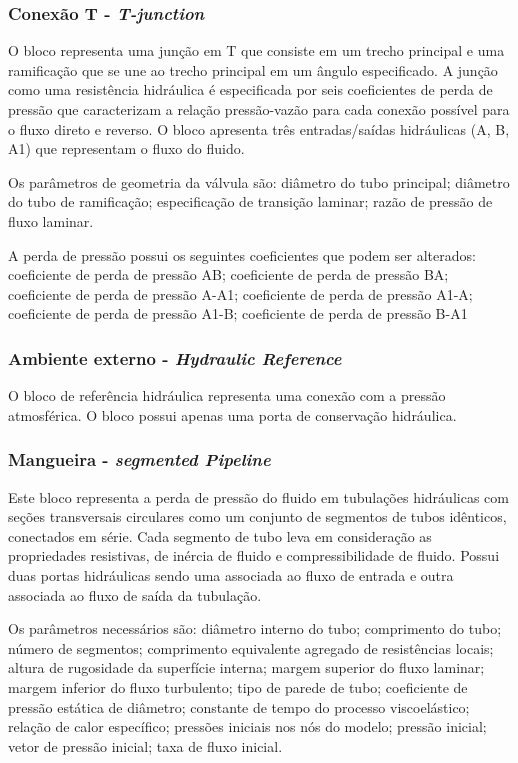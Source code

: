     \subsubsection{ Conexão T - \textit{T-junction} }
    \par O bloco representa uma junção em T que consiste em um trecho principal e uma ramificação que se une ao trecho principal em um ângulo especificado. A junção como uma resistência hidráulica é especificada por seis coeficientes de perda de pressão que caracterizam a relação pressão-vazão para cada conexão possível para o fluxo direto e reverso. O bloco apresenta três entradas/saídas hidráulicas (A, B, A1) que representam o fluxo do fluido. 
    \par Os parâmetros de geometria da válvula são: diâmetro do tubo principal; diâmetro do tubo de ramificação; especificação de transição laminar; razão de pressão de fluxo laminar.
    \par A perda de pressão possui os seguintes coeficientes que podem ser alterados: coeficiente de perda de pressão AB; coeficiente de perda de pressão BA; coeficiente de perda de pressão A-A1; coeficiente de perda de pressão A1-A; coeficiente de perda de pressão A1-B; coeficiente de perda de pressão B-A1
    
    \subsubsection{ Ambiente externo - \textit{Hydraulic Reference}} \par O bloco de referência hidráulica representa uma conexão com a pressão atmosférica. O bloco possui apenas uma porta de conservação hidráulica.
    
    \subsubsection{ Mangueira - \textit{segmented Pipeline}}
	\par Este bloco representa a perda de pressão do fluido em tubulações hidráulicas com seções transversais circulares como um conjunto de segmentos de tubos idênticos, conectados em série. Cada segmento de tubo leva em consideração as propriedades resistivas, de inércia de fluido e compressibilidade de fluido. Possui duas portas hidráulicas sendo uma associada ao fluxo de entrada e outra associada ao fluxo de saída da tubulação. 
	\par Os parâmetros necessários são: diâmetro interno do tubo; comprimento do tubo; número de segmentos; comprimento equivalente agregado de resistências locais; altura de rugosidade da superfície interna; margem superior do fluxo laminar; margem inferior do fluxo turbulento; tipo de parede de tubo; coeficiente de pressão estática de diâmetro; constante de tempo do processo viscoelástico; relação de calor específico; pressões iniciais nos nós do modelo; pressão inicial; vetor de pressão inicial; taxa de fluxo inicial.
	
